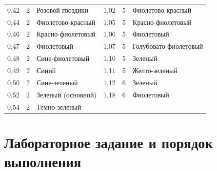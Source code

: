 \documentclass[12pt,a4paper]{article}
\theoremstyle{plain}
\theoremstyle{definition}
\theoremstyle{remark}
\numberwithin{equation}{section}
\begin{document}
\begin{table}[H]
\begin{tabularx}{\textwidth}{|c|c|X||c|c|X|}
        0,42 & 2 & Розовой гвоздики & 1,02 & 5 & Фиолетово-красный \\
        0,44 & 2 & Фиолетово-красный & 1,05 & 5 & Красно-фиолетовый \\
        0,46 & 2 & Красно-фиолетовый & 1,06 & 5 & Фиолетовый \\
        0,47 & 2 & Фиолетовый & 1,07 & 5 & Голубовато-фиолетовый \\
        0,48 & 2 & Сине-фиолетовый & 1,10 & 5 & Зеленый \\
        0,49 & 2 & Синий & 1,11 & 5 & Желто-зеленый \\
        0,50 & 2 & Сине-зеленый & 1,12 & 6 & Зеленый \\
        0,52 & 2 & Зеленый (основной) & 1,18 & 6 & Фиолетовый \\
        0,54 & 2 & Темно-зеленый & & & \\
        \hline
    \end{tabularx}
\end{table}

\section{Лабораторное задание и порядок выполнения}
\end{document}
